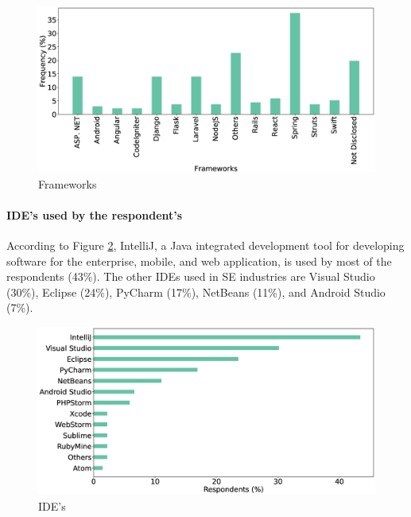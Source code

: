 \begin{figure}[h]
\centering
  \includegraphics[scale=0.18]{Figures/Respondents_frameworks}
  \caption{Frameworks}
  \label{fig:frameworks}
\end{figure}


\paragraph{IDE's used by the respondent's}
According to Figure \ref{fig:IDEs}, IntelliJ, a Java integrated development tool for developing software for the enterprise, mobile, and web application, is used by most of the respondents (43\%). The other IDEs used in SE industries are Visual Studio (30\%), Eclipse (24\%), PyCharm (17\%), NetBeans (11\%), and Android Studio (7\%).

\begin{figure}[htbp]
\centering
  \includegraphics[scale=0.18]{Figures/Respondents_IDEs}
  \caption{IDE's}
  \label{fig:IDEs}
\end{figure}

